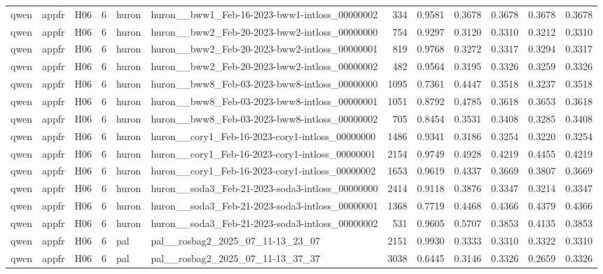 \begin{table}[tbp]
\begin{tabular}{lllrllrrrrrr}
qwen & appfr & H06 & 6 & huron & huron\_\_bww1\_Feb-16-2023-bww1-intloss\_00000002 & 334 & 0.9581 & 0.3678 & 0.3678 & 0.3678 & 0.3678 \\
qwen & appfr & H06 & 6 & huron & huron\_\_bww2\_Feb-20-2023-bww2-intloss\_00000000 & 754 & 0.9297 & 0.3120 & 0.3310 & 0.3212 & 0.3310 \\
qwen & appfr & H06 & 6 & huron & huron\_\_bww2\_Feb-20-2023-bww2-intloss\_00000001 & 819 & 0.9768 & 0.3272 & 0.3317 & 0.3294 & 0.3317 \\
qwen & appfr & H06 & 6 & huron & huron\_\_bww2\_Feb-20-2023-bww2-intloss\_00000002 & 482 & 0.9564 & 0.3195 & 0.3326 & 0.3259 & 0.3326 \\
qwen & appfr & H06 & 6 & huron & huron\_\_bww8\_Feb-03-2023-bww8-intloss\_00000000 & 1095 & 0.7361 & 0.4447 & 0.3518 & 0.3237 & 0.3518 \\
qwen & appfr & H06 & 6 & huron & huron\_\_bww8\_Feb-03-2023-bww8-intloss\_00000001 & 1051 & 0.8792 & 0.4785 & 0.3618 & 0.3653 & 0.3618 \\
qwen & appfr & H06 & 6 & huron & huron\_\_bww8\_Feb-03-2023-bww8-intloss\_00000002 & 705 & 0.8454 & 0.3531 & 0.3408 & 0.3285 & 0.3408 \\
qwen & appfr & H06 & 6 & huron & huron\_\_cory1\_Feb-16-2023-cory1-intloss\_00000000 & 1486 & 0.9341 & 0.3186 & 0.3254 & 0.3220 & 0.3254 \\
qwen & appfr & H06 & 6 & huron & huron\_\_cory1\_Feb-16-2023-cory1-intloss\_00000001 & 2154 & 0.9749 & 0.4928 & 0.4219 & 0.4455 & 0.4219 \\
qwen & appfr & H06 & 6 & huron & huron\_\_cory1\_Feb-16-2023-cory1-intloss\_00000002 & 1653 & 0.9619 & 0.4337 & 0.3669 & 0.3807 & 0.3669 \\
qwen & appfr & H06 & 6 & huron & huron\_\_soda3\_Feb-21-2023-soda3-intloss\_00000000 & 2414 & 0.9118 & 0.3876 & 0.3347 & 0.3214 & 0.3347 \\
qwen & appfr & H06 & 6 & huron & huron\_\_soda3\_Feb-21-2023-soda3-intloss\_00000001 & 1368 & 0.7719 & 0.4468 & 0.4366 & 0.4379 & 0.4366 \\
qwen & appfr & H06 & 6 & huron & huron\_\_soda3\_Feb-21-2023-soda3-intloss\_00000002 & 531 & 0.9605 & 0.5707 & 0.3853 & 0.4135 & 0.3853 \\
qwen & appfr & H06 & 6 & pal & pal\_\_rosbag2\_2025\_07\_11-13\_23\_07 & 2151 & 0.9930 & 0.3333 & 0.3310 & 0.3322 & 0.3310 \\
qwen & appfr & H06 & 6 & pal & pal\_\_rosbag2\_2025\_07\_11-13\_37\_37 & 3038 & 0.6445 & 0.3146 & 0.3326 & 0.2659 & 0.3326 \\

\end{tabular}
\end{table}
